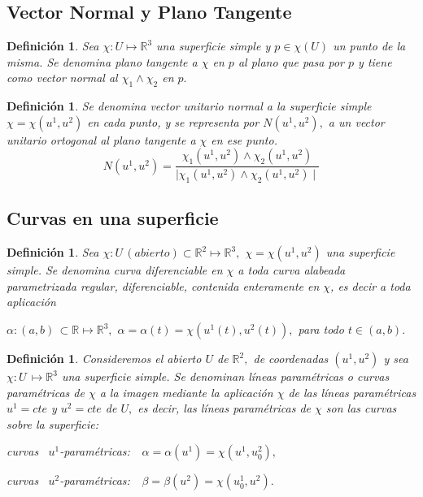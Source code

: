 \documentclass[twoside]{article}
\newtheorem{defi}[theorem]{Definición}
\numberwithin{equation}{section}
\begin{document}
\subsection{Vector Normal y Plano Tangente}

\begin{defi}
Sea $\chi: U \mapsto \mathbb{R}^3$ una superficie simple y $ p\in \chi(U)$ un punto de la misma. Se denomina {\em plano tangente} a $\chi$ en $p$ al plano que pasa por $p$ y tiene como vector normal al $\chi_1 \wedge \chi_2$ en $p.$
\end{defi}

\begin{defi}
Se denomina {\em vector unitario normal} a la superficie simple $\chi = \chi(u^1, u^2)$ en cada punto, y se representa por $ N(u^1, u^2),$ a un vector unitario ortogonal al plano tangente a $\chi$ en ese punto.
\begin{equation*}
N(u^1, u^2) = \frac{\chi_1(u^1, u^2) \wedge \chi_2(u^1, u^2)}{\mid \chi_1(u^1, u^2) \wedge \chi_2(u^1, u^2) \mid}
\end{equation*}
\end{defi}

\subsection{Curvas en una superficie}


\begin{defi} Sea $\chi : U \, (abierto) \subset \mathbb{R}^2 \mapsto \mathbb{R}^3,$ $\chi = \chi(u^1, u^2)$ una superficie simple. Se denomina {\em curva diferenciable} en $\chi$ a toda curva alabeada parametrizada regular, diferenciable, contenida entera\-mente en $\chi$, es decir a toda aplicación

$\alpha : (a,b) \, \subset \mathbb{R} \mapsto \mathbb{R}^3,$ $\alpha =
\alpha(t) = \chi(u^1(t), u^2(t)),$ para todo $ t \in (a,b).$
\end{defi}


\begin{defi} Consideremos el abierto $U$ de $\mathbb{R}^2,$ de coordenadas
$(u^1, u^2)$ y sea $\chi : U \, \mapsto \mathbb{R}^3$ una
superficie simple. Se denominan {\em líneas paramétricas o curvas
paramétricas} de $\chi$ a la imagen mediante la aplicación  $\chi$
de las líneas paramétricas $u^1 = cte$ y $u^2 = cte$ de $U,$ es decir,
las líneas paramétricas de $\chi$ son las curvas sobre la
superficie:
\begin{center} curvas \, $u^1$-param\'etricas: \,\, $\alpha =
\alpha(u^1) = \chi(u^1, u^2_0),$

curvas \, $u^2$-param\'etricas: \,\, $\beta = \beta(u^2) =
\chi(u^1_0, u^2).$
\end{center}
\end{defi}
\end{document}
